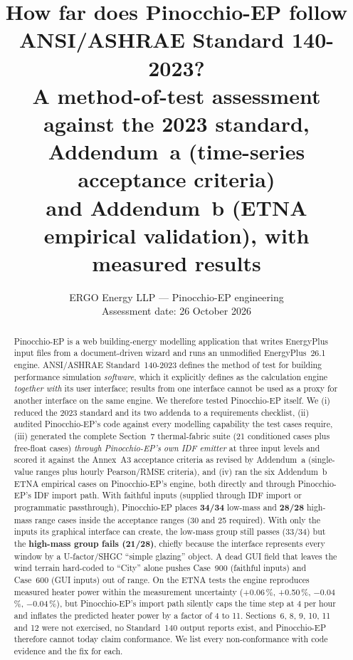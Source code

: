 \documentclass[10pt,a4paper]{article}
\title{\textbf{How far does Pinocchio-EP follow ANSI/ASHRAE Standard 140-2023?}\\[3pt]
\large A method-of-test assessment against the 2023 standard, Addendum~a (time-series acceptance criteria)\\
and Addendum~b (ETNA empirical validation), with measured results}
\author{ERGO Energy LLP --- Pinocchio-EP engineering\\\small Assessment date: 26 October 2026}
\date{}
\begin{document}
\maketitle

\begin{abstract}
\noindent
Pinocchio-EP is a web building-energy modelling application that writes EnergyPlus input files from a
document-driven wizard and runs an unmodified EnergyPlus~26.1 engine. ANSI/ASHRAE Standard~140-2023 defines the
method of test for building performance simulation \emph{software}, which it explicitly defines as the calculation
engine \emph{together with} its user interface; results from one interface cannot be used as a proxy for another
interface on the same engine. We therefore tested Pinocchio-EP itself. We (i) reduced the 2023 standard and its two
addenda to a requirements checklist, (ii) audited Pinocchio-EP's code against every modelling capability the test
cases require, (iii) generated the complete Section~7 thermal-fabric suite (21 conditioned cases plus free-float
cases) \emph{through Pinocchio-EP's own IDF emitter} at three input levels and scored it against the Annex~A3
acceptance criteria as revised by Addendum~a (single-value ranges plus hourly Pearson/RMSE criteria), and
(iv) ran the six Addendum~b ETNA empirical cases on Pinocchio-EP's engine, both directly and through Pinocchio-EP's
IDF import path.
With faithful inputs (supplied through IDF import or programmatic passthrough), Pinocchio-EP places
\textbf{34/34} low-mass and \textbf{28/28} high-mass range cases inside the acceptance ranges (30 and 25 required).
With only the inputs its graphical interface can create, the low-mass group still passes (33/34) but the
\textbf{high-mass group fails (21/28)}, chiefly because the interface represents every window by a U-factor/SHGC
``simple glazing'' object. A dead GUI field that leaves the wind terrain hard-coded to ``City'' alone pushes Case~900
(faithful inputs) and Case~600 (GUI inputs) out of range. On the ETNA tests the engine reproduces measured heater
power within the measurement uncertainty (+0.06\,\%, +0.50\,\%, $-$0.04\,\%, $-$0.04\,\%), but Pinocchio-EP's import
path silently caps the time step at 4 per hour and inflates the predicted heater power by a factor of 4 to 11.
Sections~6, 8, 9, 10, 11 and 12 were not exercised, no Standard~140 output reports exist, and Pinocchio-EP therefore
cannot today claim conformance. We list every non-conformance with code evidence and the fix for each.
\end{abstract}
\end{document}
